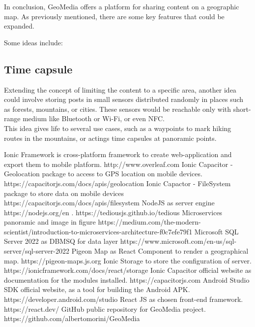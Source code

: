 \documentclass[conference]{IEEEtran}
\begin{document}
In conclusion, GeoMedia offers a platform for sharing content on a geographic map. As previously mentioned, there are some key features that could be expanded.

Some ideas include:

\subsection{Time capsule}

Extending the concept of limiting the content to a specific area, another idea could involve storing posts in small sensors distributed randomly in places such as forests, mountains, or cities. 
These sensors would be reachable only with short-range medium like Bluetooth or Wi-Fi, or even NFC.
\\
This idea gives life to several use cases, such as a waypoints to mark hiking routes in the mountains, or actings time capsules at panoramic points.


\begin{thebibliography}{00}
 Ionic Framework is cross-platform framework to create web-application and export them to mobile platform. http://www.overleaf.com
 Ionic Capacitor - Geolocation package to access to GPS location on mobile devices. https://capacitorjs.com/docs/apis/geolocation
Ionic Capactor - FileSystem package to store data on mobile devices https://capacitorjs.com/docs/apis/filesystem
 NodeJS as server engine https://nodejs.org/en
. https://tediousjs.github.io/tedious
 Microservices panoramic and image in figure https://medium.com/the-modern-scientist/introduction-to-microservices-architecture-f0c7efe79f1
 Microsoft SQL Server 2022 as DBMSQ for data layer https://www.microsoft.com/en-us/sql-server/sql-server-2022
 Pigeon Map as React Component to render a geographical map. https://pigeon-maps.js.org
Ionic Storage to store the configuration of server. https://ionicframework.com/docs/react/storage
Ionic Capacitor official website as documentation for the modules installed. https://capacitorjs.com
Android Studio SDK official website, as a tool for building the Android APK. https://developer.android.com/studio
React JS as chosen front-end framework. https://react.dev/
GitHub public repository for GeoMedia project. https://github.com/albertomorini/GeoMedia
\end{thebibliography}

\vspace{12pt}
\end{document}
